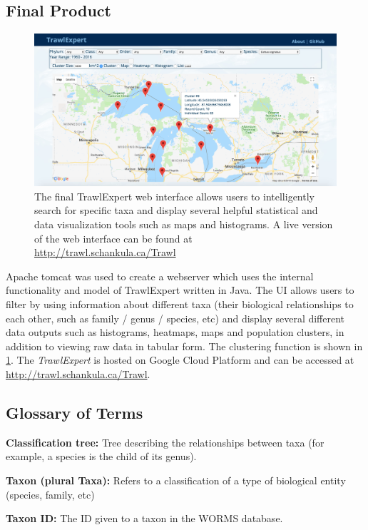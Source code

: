 \documentclass{article}
\begin{document}
\subsection{Final Product}
\begin{figure}
\centering
\includegraphics[width=16cm]{UI.png}
\caption{The final TrawlExpert web interface allows users to intelligently search for specific taxa and display several helpful statistical and data visualization tools such as maps and histograms. A live version of the web interface can be found at \url{http://trawl.schankula.ca/Trawl}}
\label{fig:UI}
\end{figure}

Apache tomcat was used to create a webserver which uses the internal functionality and model of TrawlExpert written in Java. The UI allows users to filter by using information about different taxa (their biological relationships to each other, such as family / genus / species, etc) and display several different data outputs such as histograms, heatmaps, maps and population clusters, in addition to viewing raw data in tabular form. The clustering function is shown in \ref{fig:UI}. The \textit{TrawlExpert} is hosted on Google Cloud Platform and can be accessed at \url{http://trawl.schankula.ca/Trawl}. 

\subsection{Glossary of Terms}
\noindent\textbf{Classification tree:} Tree describing the relationships between taxa (for example, a species is the child of its genus).

\noindent\textbf{Taxon (plural Taxa):} Refers to a classification of a type of biological entity (species, family, etc)

\noindent\textbf{Taxon ID:} The ID given to a taxon in the WORMS database.
\end{document}
